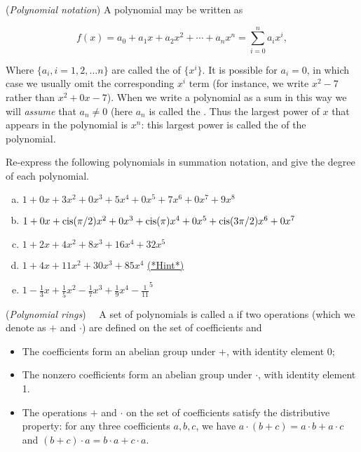 \begin{defn} (\emph{Polynomial notation}) A polynomial may be written as

\[f(x) = a_0 + a_1 x +a_2 x^2 + \cdots + a_n x^n = \sum^{n}_{i=0} a_i x^i, \]

Where $\{ a_i ,  i=1,2,\ldots n\}$ are called the   of $\{x^i\}$. It is possible for $a_i = 0$, in which case we usually omit the corresponding $x^i$ term (for instance, we write $x^2 -7$ rather than $x^2 + 0x -7$). When we write a polynomial as a sum in this way we will \emph{assume} that $a_n \neq 0$ (here $a_n$ is called the .  Thus the largest power of $x$ that appears in the polynomial is $x^n$: this largest power is called the  of the polynomial.
\end{defn}
\begin{exercise}\label{exercise:poly:poly4}
Re-express the following polynomials in summation notation,  and give the degree of each polynomial.
\begin{enumerate}[(a)]
\item
$1 + 0x + 3x^2 + 0x^3 + 5x^4 + 0x^5 + 7x^6 +0x^7 +  9x^8$
\item
$1 + 0x + \operatorname{cis}(\pi/2)x^2 + 0x^3 + \operatorname{cis}(\pi)x^4 + 0x^5  + \operatorname{cis}(3\pi/2)x^6 + 0x^7$
\item
$1+ 2x + 4x^2 + 8x^3 + 16x^4 + 32x^5$
\item
$1+4x+11x^2+30x^3+85x^4$
\hyperref[sec:polyrings:hints]{(*Hint*)} 
\item
$1-\frac{1}{3}x + \frac{1}{5}x^2 - \frac{1}{7}x^3 + \frac{1}{9}x^4 - \frac{1}{11}^5$
\end{enumerate}
\end{exercise}


\begin{defn} \label{def:polyring}(\emph{Polynomial rings})~~
A set of polynomials is called a  if two operations (which we denote as $+$ and $\cdot$)  are defined on the set of coefficients and
\begin{itemize}
\item
The coefficients form an abelian group under +, with identity element 0;
\item
The nonzero coefficients form an abelian group under $\cdot$, with identity element 1.
\item The operations $+$ and $\cdot$ on the set of coefficients satisfy the distributive property: for any three coefficients $a,b,c$, we have $a \cdot (b + c) = a \cdot b + a \cdot c$ and 
$(b + c) \cdot a = b \cdot a + c \cdot a$.
\end{itemize}
\end{defn}

